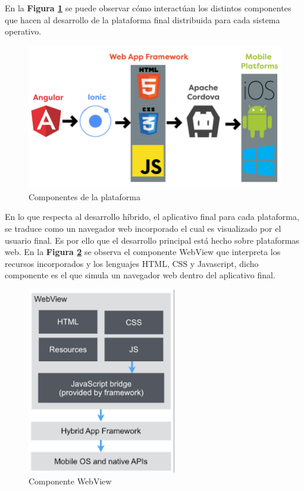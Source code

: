 \documentclass{IEEEtran}
\begin{document}
			En la \textbf{Figura \ref{ionic-angular-cordova}} se puede observar cómo interactúan los distintos componentes que hacen al desarrollo de la plataforma final distribuida para cada sistema operativo.

			\begin{figure}
				\centering
				\includegraphics[width=1\linewidth]{ionic-angular-cordova}
				\caption{Componentes de la plataforma}
				\label{ionic-angular-cordova}
			\end{figure}

			En lo que respecta al desarrollo híbrido, el aplicativo final para cada plataforma, se traduce como un navegador web incorporado el cual es visualizado por el usuario final. Es por ello que el desarrollo principal está hecho sobre plataformas web. En la \textbf{Figura \ref{ionic-angular-cordova-webview}} se observa el componente WebView que interpreta los recursos incorporados y los lenguajes HTML, CSS y Javascript, dicho componente es el que simula un navegador web dentro del aplicativo final.

			\begin{figure}
				\centering
				\includegraphics[width=0.6\linewidth]{ionic-angular-cordova-webview}
				\caption{Componente WebView}
				\label{ionic-angular-cordova-webview}
			\end{figure}
\end{document}
